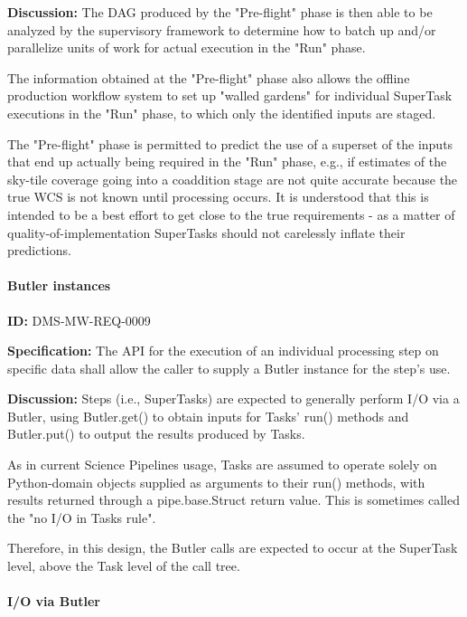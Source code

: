 \documentclass[SE,toc,lsstdraft]{lsstdoc}
\begin{document}
\textbf{Discussion:}
The DAG produced by the "Pre-flight" phase is then able to be analyzed by the supervisory framework to determine how to batch up and/or parallelize units of work for actual execution in the "Run" phase.

The information obtained at the "Pre-flight" phase also allows the offline production workflow system to set up "walled gardens" for individual SuperTask executions in the "Run" phase, to which only the identified inputs are staged.

The "Pre-flight" phase is permitted to predict the use of a superset of the inputs that end up actually being required in the "Run" phase, e.g., if estimates of the sky-tile coverage going into a coaddition stage are not quite accurate because the true WCS is not known until processing occurs. It is understood that this is intended to be a best effort to get close to the true requirements - as a matter of quality-of-implementation SuperTasks should not carelessly inflate their predictions.

\paragraph{Butler instances}\hfill  %

\label{DMS-MW-REQ-0009}
\textbf{ID:} DMS-MW-REQ-0009

\textbf{Specification:}
The API for the execution of an individual processing step on specific data shall allow the caller to supply a Butler instance for the step's use.

\textbf{Discussion:}
Steps (i.e., SuperTasks) are expected to generally perform I/O via a Butler, using Butler.get() to obtain inputs for Tasks' run() methods and Butler.put() to output the results produced by Tasks.

As in current Science Pipelines usage, Tasks are assumed to operate solely on Python-domain objects supplied as arguments to their run() methods, with results returned through a pipe.base.Struct return value. This is sometimes called the "no I/O in Tasks rule".

Therefore, in this design, the Butler calls are expected to occur at the SuperTask level, above the Task level of the call tree.

\paragraph{I/O via Butler}\hfill  %
\end{document}
